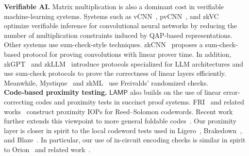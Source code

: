 \documentclass[conference,compsoc]{IEEEtran}
\newcommand{\protocol}{\textsf{LAMP}}   %
\theoremstyle{plain}
\theoremstyle{definition}
\theoremstyle{remark}
\begin{document}
\noindent\textbf{Verifiable AI.}
Matrix multiplication is also a dominant cost in verifiable machine-learning
systems. Systems such as vCNN~\cite{lee2024vcnn}, pvCNN~\cite{pvCNN}, and
zkVC~\cite{zhang2025zkvc} optimize verifiable inference for convolutional neural
networks by reducing the number of multiplication constraints induced by
QAP-based representations. Other systems use sum-check-style techniques.
zkCNN~\cite{liu2021zkcnn} proposes a sum-check-based protocol for proving
convolutions with linear prover time. In addition, zkGPT~\cite{zkGPT} and
zkLLM~\cite{zkLLM} introduce protocols specialized for LLM architectures and
use sum-check protocols to prove the correctness of linear layers efficiently.
Meanwhile, Mystique~\cite{weng2021mystique} and zkML~\cite{chen2024zkml} use
Freivalds' randomized checks. \\

\noindent\textbf{Code-based proximity testing.}
\(\protocol\) also builds on the use of linear error-correcting codes and proximity
tests in succinct proof systems. FRI~\cite{FRI} and related
works~\cite{STIR,WHIR} construct proximity IOPs for
Reed--Solomon codewords. Recent work further extends this viewpoint to more
general foldable codes~\cite{basefold}.
Our proximity layer is closer in spirit to the local codeword tests used in
Ligero~\cite{Ligero}, Brakedown~\cite{golovnev2023brakedown}, and
Blaze~\cite{blaze}. In particular, our use of in-circuit encoding checks is similar in spirit to Orion~\cite{orion} and related work~\cite{restoring_orion}.

\end{document}
